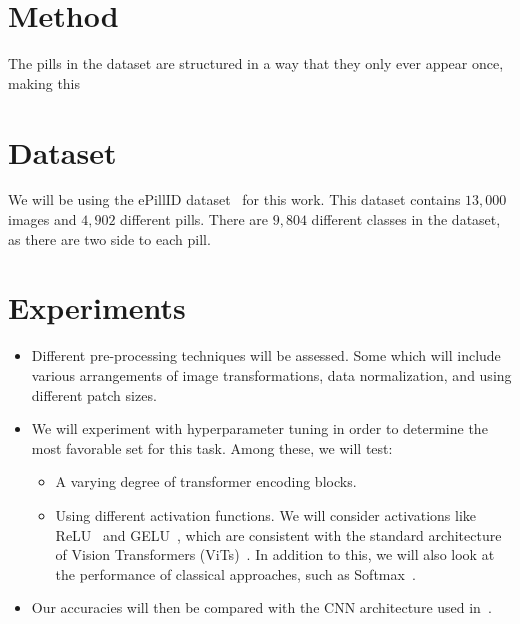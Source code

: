 \documentclass[10pt,twocolumn,letterpaper]{article}
\begin{document}
\section{Method}

The pills in the dataset are structured in a way that they only ever appear once, making this 

\section{Dataset}
We will be using the ePillID dataset~\cite{ePill} for this work.  This dataset contains $13,000$ images and $4,902$ different pills.  There are $9,804$ different classes in the dataset, as there are two side to each pill.

\section{Experiments}
\begin{itemize}

    \item Different pre-processing techniques will be assessed. Some which will include various arrangements of image transformations, data normalization, and using different patch sizes.
    
    \item We will experiment with hyperparameter tuning in order to determine the most favorable set for this task.  Among these, we will test:

    \begin{itemize}
    
        \item A varying degree of transformer encoding blocks. 

        \item Using different activation functions.  We will consider activations like ReLU~\cite{relu2010} and GELU~\cite{gelu2016}, which are consistent with the standard architecture of Vision Transformers (ViTs)~\cite{an_imageworth}.  In addition to this, we will also look at the performance of classical approaches, such as Softmax~\cite{softmax}.

        
    \end{itemize}

    \item Our accuracies will then be compared with the CNN architecture used in~\cite{ePill}.
\end{itemize}
\end{document}
